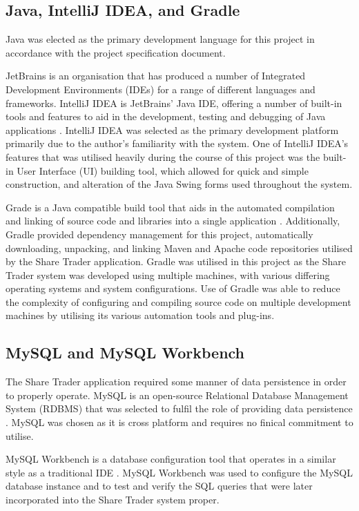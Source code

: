 \documentclass[12pt, a4paper,titlepage]{article}
\begin{document}
\subsection{Java, IntelliJ IDEA, and Gradle}
Java was elected as the primary development language for this project in
accordance with the project specification document.

JetBrains is an organisation that has produced a number of Integrated
Development Environments (IDEs) for a range of different languages and
frameworks.
IntelliJ IDEA is JetBrains' Java IDE, offering a number of built-in tools and
features to aid in the development, testing and debugging of Java
applications \cite{Idea}.
IntelliJ IDEA was selected as the primary development platform primarily due to
the author's familiarity with the system.
One of IntelliJ IDEA's features that was utilised heavily during the course
of this project was the built-in User Interface (UI) building tool, which
allowed for quick and simple construction, and alteration of the Java Swing
forms used throughout the system.

Grade is a Java compatible build tool that aids in the automated compilation
and linking of source code and libraries into a single application
\cite{Gradle}. 
Additionally, Gradle provided dependency management for this project,
automatically downloading, unpacking, and linking Maven and Apache code
repositories utilised by the Share Trader application.
Gradle was utilised in this project as the Share Trader system was developed
using multiple machines, with various differing operating systems and system
configurations.
Use of Gradle was able to reduce the complexity of configuring and compiling
source code on multiple development machines by utilising its various
automation tools and plug-ins.

\subsection{MySQL and MySQL Workbench}
The Share Trader application required some manner of data persistence in order
to properly operate.
MySQL is an open-source Relational Database Management System (RDBMS) that was
selected to fulfil the role of providing data persistence \cite{Mysql}.
MySQL was chosen as it is cross platform and requires no finical commitment
to utilise.

MySQL Workbench is a database configuration tool that operates in a similar
style as a traditional IDE \cite{Workbench}.
MySQL Workbench was used to configure the MySQL database instance and to test
and verify the SQL queries that were later incorporated into the Share
Trader system proper.
\end{document}
